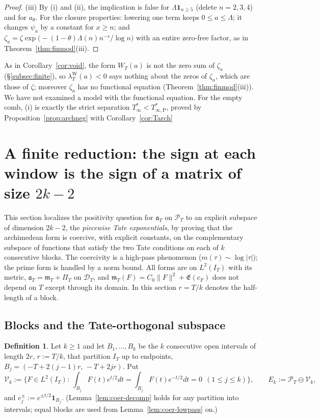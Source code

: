 \documentclass[11pt]{amsart}
\theoremstyle{definition}
\newtheorem{definition}[theorem]{Definition}
\theoremstyle{remark}
\newcommand{\PT}{\mathcal P_T}
\newcommand{\IT}{I_T}
\newcommand{\cF}{c_F}
\newcommand{\Lev}{\mathfrak E}
\newcommand{\PiT}{\Pi_T}
\newcommand{\mT}{\mathfrak m_T}
\begin{document}
\begin{proof}
(iii) By (i) and (ii), the implication is false for $\Lambda\mathbf 1_{n\ge5}$ (delete $n=2,3,4$) and for $a_\theta$.
For the closure properties: lowering one term keeps $0\le a\le\Lambda$; it changes $\psi_a$ by a constant for
$x\ge n$; and $\zeta_a=\zeta\exp\big(-(1-\theta)\Lambda(n)n^{-s}/\log n\big)$ with an entire zero-free factor, as in
Theorem~\ref{thm:finmod}(iii).
\end{proof}

As in Corollary~\ref{cor:void}, the form $W_T(a)$ is not the zero sum of $\zeta_a$ (\S\ref{subsec:finite}), so
$\lambda^{\mathrm W}_T(a)<0$ says nothing about the zeros of $\zeta_a$, which are those of $\zeta$; moreover $\zeta_a$
has no functional equation (Theorem~\ref{thm:finmod}(iii)). We have not examined a model with the
functional equation. For the empty comb, (i) is exactly the strict separation
$T^*_\infty<T^*_{\infty,\mathrm P}$, proved by Proposition~\ref{prop:archneg} with Corollary~\ref{cor:Tarch}

\section{A finite reduction: the sign at each window is the sign of a matrix of size \texorpdfstring{$2k-2$}{2k-2}}\label{sec:coer}

This section localizes the positivity question for $\mathfrak a_T$ on $\PT$ to an explicit subspace of
dimension $2k-2$, the \emph{piecewise Tate exponentials}, by proving that the archimedean form is coercive,
with explicit constants, on the complementary subspace of functions that satisfy the two Tate conditions on
each of $k$ consecutive blocks. The coercivity is a high-pass phenomenon ($m(\tau)\sim\log|\tau|$); the prime
form is handled by a norm bound. All forms are on $L^2(\IT)$ with its metric, $\mathfrak a_T=\mT+\PiT$ on
$\mathcal D_T$, and $\mT(F)=C_0\|F\|^2+\Lev(\cF)$ does not depend on $T$ except through its domain. In this
section $r=T/k$ denotes the half-length of a block.

\subsection{Blocks and the Tate-orthogonal subspace}\label{subsec:coer-blocks}

\begin{definition}\label{def:coer-V}
Let $k\ge1$ and let $B_1,\dots,B_k$ be the $k$ consecutive open intervals of length $2r$,
$r:=T/k$, that partition $\IT$ up to endpoints, $B_j=(-T+2(j-1)r,\,-T+2jr)$. Put
\[
\mathcal V_k:=\Big\{F\in L^2(\IT):\ \int_{B_j}F(t)e^{t/2}dt=\int_{B_j}F(t)e^{-t/2}dt=0\ \ (1\le j\le k)\Big\},
\qquad E_k:=\PT\ominus\mathcal V_k ,
\]
and $e_j^\pm:=e^{\pm t/2}\mathbf 1_{B_j}$. (Lemma~\ref{lem:coer-decomp} holds for any partition into
intervals; equal blocks are used from Lemma~\ref{lem:coer-lowpass} on.)
\end{definition}
\end{document}
